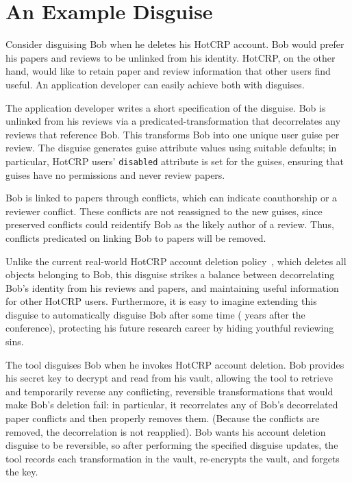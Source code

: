 \section{An Example Disguise}
\label{design:eg}
%
Consider disguising Bob when he deletes his HotCRP account.
%
Bob would prefer his papers and reviews to be unlinked from his identity.
%
HotCRP, on the other hand, would like to retain paper and review information that other users
find useful.
%
An application developer can easily achieve both with disguises.
%

The application developer writes a short specification of the disguise. Bob is unlinked from his
reviews via a predicated-transformation that decorrelates any reviews that reference Bob.
%
This transforms Bob into one unique user guise per review.
%
The disguise generates guise attribute values using suitable defaults;
%
in particular, HotCRP users' \texttt{disabled} attribute is set for the guises, ensuring that guises
have no permissions and never review papers.
%

%
Bob is linked to papers through conflicts, which can indicate coauthorship or a reviewer conflict.
%
These conflicts are not reassigned to the new guises, since preserved conflicts could reidentify Bob
as the likely author of a review. Thus, conflicts predicated on linking Bob to papers will be
removed.

Unlike the current real-world HotCRP account deletion policy~\cite{hotcrp:privacy}, which deletes
all objects belonging to Bob, this disguise strikes a balance between decorrelating Bob's identity
from his reviews and papers, and maintaining useful information for other HotCRP users.
%
Furthermore, it is easy to imagine extending this disguise to automatically disguise Bob after some
time ( years after the conference), protecting his future research career by hiding youthful
reviewing sins.
%

The tool disguises Bob when he invokes HotCRP account deletion. Bob provides his secret key to
decrypt and read from his vault, allowing the tool to retrieve and temporarily reverse any conflicting,
reversible transformations that would make Bob's deletion fail: in particular, it recorrelates any
of Bob's decorrelated paper conflicts and then properly removes them. (Because the conflicts are
removed, the decorrelation is not reapplied).  Bob wants his account deletion disguise to be
reversible, so after performing the specified disguise updates, the tool records each transformation
in the vault, re-encrypts the vault, and forgets the key.
